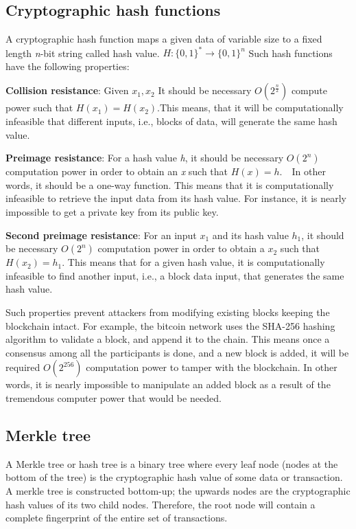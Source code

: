 \documentclass[11pt,a4paper]{report}
\begin{document}
\subsection{Cryptographic hash functions}\label{sec:chf}
A cryptographic hash function\cite{chf}\cite{book:chf} maps a given data of variable size to a fixed length \emph{n}-bit string called hash value. $ H : \{0,1\}^* \to \{0,1\}^n $ Such hash functions have the following properties:
\begin{description}		
	\item \textbf{Collision resistance}: Given $x_1, x_2 $ It should be necessary $ O(2^\frac{n}{2}) $ compute power such that $H(x_1) = H(x_2).$This means, that it will be computationally infeasible that different inputs, i.e., blocks of data, will generate the same hash value.	
	\item \textbf{Preimage resistance}: For a hash value \emph{h}, it should be necessary $ O(2^n) $ computation power in order to obtain an \emph{x} such that $ H(x)=h $.~~In other words, it should be a one-way function. 
	This means that it is computationally infeasible to retrieve the input data from its hash value. For instance, it is nearly impossible to get a private key from its public key.	
	\item \textbf{Second preimage resistance}: For an input $x_1$ and its hash value $h_1$, it should be necessary $ O(2^n) $ computation power in order to obtain a $x_2$ such that $H(x_2)=h_1.$ This means that for a given hash value, it is computationally infeasible to find another input, i.e., a block data input, that generates the same hash value. 	
\end{description}

Such properties prevent attackers from modifying existing blocks keeping the blockchain intact. For example, the bitcoin network uses the SHA-256 hashing algorithm to validate a block, and append it to the chain. This means once a consensus among all the participants is done, and a new block is added, it will be required $ O(2^{256}) $ computation power to tamper with the blockchain. In other words, it is nearly impossible to manipulate an added block as a result of the tremendous computer power that would be needed.

\subsection{Merkle tree}\label{sec:mt}
A Merkle tree\cite{article:merkle}\cite{book:merkle} or hash tree is a binary tree where every leaf node (nodes at the bottom of the tree) is the cryptographic hash value of some data or transaction. A merkle tree is constructed bottom-up; the upwards nodes are the cryptographic hash values of its two child nodes. Therefore, the root node  will contain a complete fingerprint of the entire set of transactions. 
\end{document}
